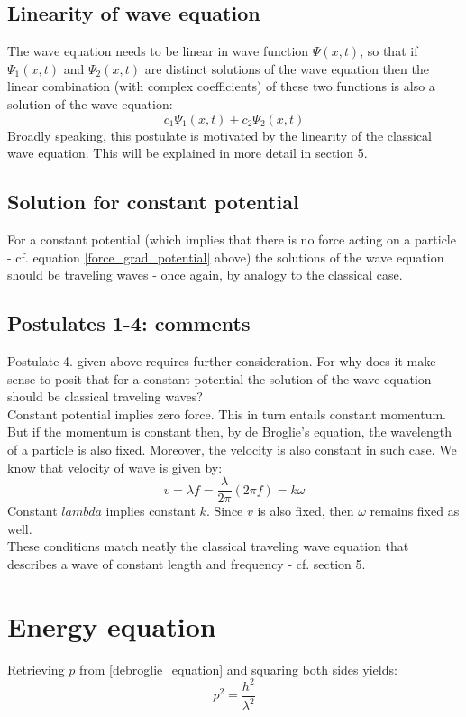 \documentclass[12pt]{article}
\begin{document}
\subsection{Linearity of wave equation}
The wave equation needs to be linear in wave function $\Psi(x, t)$, so that if $\Psi_1(x, t)$ and $\Psi_2(x,t)$ are distinct solutions of the wave equation then the linear combination (with complex coefficients) of these two functions is also a solution of the wave equation:
\begin{equation}
c_1 \Psi_1(x,t) + c_2 \Psi_2(x, t)
\end{equation}
Broadly speaking, this postulate is motivated by the linearity of the classical wave equation. 
This will be explained in more detail in section 5.

\subsection{Solution for constant potential}
For a constant potential (which implies that there is no force acting on a particle - cf. equation \eqref{force_grad_potential} above) the solutions of the wave equation should be traveling waves - once again, by analogy to the classical case. 

\subsection{Postulates 1-4: comments}
Postulate 4. given above requires further consideration. For why does it make sense to posit that for a constant potential the solution of the wave equation should be classical traveling waves? 
\\ \indent Constant potential implies zero force. This in turn entails constant momentum. 
But if the momentum is constant then, by de Broglie's equation, the wavelength of a particle is also fixed. Moreover, the velocity is also constant in such case. We know that velocity of wave is given by:
\begin{equation}
v = \lambda f = \frac{\lambda}{2 \pi} (2 \pi f) = k \omega
\end{equation}
Constant $lambda$ implies constant $k$. Since $v$ is also fixed, then $\omega$ remains fixed as well. 
\\ \indent These conditions match neatly the classical traveling wave equation that describes a wave of constant length and frequency - cf. section 5.

\section{Energy equation}
Retrieving $p$ from \eqref{debroglie_equation} and squaring both sides yields:
\begin{equation*}
p^2 = \frac{h^2}{\lambda^2}
\end{equation*}
\end{document}
